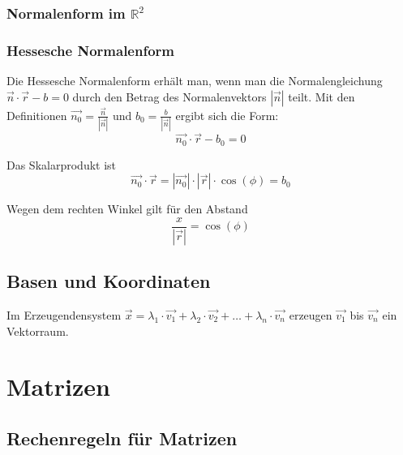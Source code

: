 \subsubsection{Normalenform im $\mathbb{R}^2$}

\subsubsection{Hessesche Normalenform}
Die Hessesche Normalenform erhält man, wenn man die Normalengleichung
$\vec{n} \cdot \vec{r} - b = 0$ durch den Betrag des Normalenvektors
$|\vec{n}|$ teilt. Mit den Definitionen $\vec{n_0} =
\frac{\vec{n}}{|\vec{n}|}$ und $b_0 = \frac{b}{|\vec{n}|}$ ergibt sich
die Form:
\[ \vec{n_0} \cdot \vec{r} - b_0 = 0 \]

Das Skalarprodukt ist
\[ \vec{n_0} \cdot \vec{r} = |\vec{n_0}| \cdot |\vec{r}| \cdot
\cos(\phi) = b_0 \]

Wegen dem rechten Winkel gilt für den Abstand
\[ \frac{x}{|\vec{r}|} = \cos(\phi)\]

\subsection{Basen und Koordinaten}
Im Erzeugendensystem $\vec{x} = \lambda_1 \cdot \vec{v_1} + \lambda_2
\cdot \vec{v_2} + \dots + \lambda_n \cdot \vec{v_n}$ erzeugen
$\vec{v_1}$ bis $\vec{v_n}$ ein Vektorraum.


\section{Matrizen}
\subsection{Rechenregeln für Matrizen}
